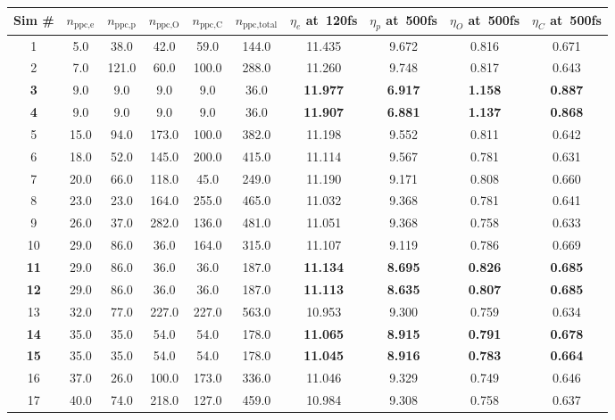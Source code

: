 \renewcommand{\arraystretch}{1}
\setlength{\tabcolsep}{0.25em}
\begin{table}
	\centering
	\begin{tabular}{c|c|c|c|c|c|c|c|c|c}
		\hline
		Sim \# & $n_\text{ppc,e}$ & $n_\text{ppc,p}$ & $n_\text{ppc,O}$ & $n_\text{ppc,C}$ & $n_\text{ppc,total}$ &$\eta_e$ at~120fs & $\eta_p$ at~500fs  & $\eta_O$ at~500fs & $\eta_C$ at~500fs\\
		\hline
		1 & 5.0 & 38.0 & 42.0 & 59.0 & 144.0 & 11.435 & 9.672 & 0.816 & 0.671\\
		2 & 7.0 & 121.0 & 60.0 & 100.0 & 288.0 & 11.260 & 9.748 & 0.817 & 0.643\\
		\textbf{3} & 9.0 & 9.0 & 9.0 & 9.0 & 36.0 & \textbf{11.977} & \textbf{6.917} & \textbf{1.158} & \textbf{0.887}\\
		\textbf{4} & 9.0 & 9.0 & 9.0 & 9.0 & 36.0 & \textbf{11.907} & \textbf{6.881} & \textbf{1.137} & \textbf{0.868}\\
		5 & 15.0 & 94.0 & 173.0 & 100.0 & 382.0 & 11.198 & 9.552 & 0.811 & 0.642\\
		6 & 18.0 & 52.0 & 145.0 & 200.0 & 415.0 & 11.114 & 9.567 & 0.781 & 0.631\\
		7 & 20.0 & 66.0 & 118.0 & 45.0 & 249.0 & 11.190 & 9.171 & 0.808 & 0.660\\
		8 & 23.0 & 23.0 & 164.0 & 255.0 & 465.0 & 11.032 & 9.368 & 0.781 & 0.641\\
		9 & 26.0 & 37.0 & 282.0 & 136.0 & 481.0 & 11.051 & 9.368 & 0.758 & 0.633\\
		10 & 29.0 & 86.0 & 36.0 & 164.0 & 315.0 & 11.107 & 9.119 & 0.786 & 0.669\\
		\textbf{11} & 29.0 & 86.0 & 36.0 & 36.0 & 187.0 & \textbf{11.134} & \textbf{8.695} & \textbf{0.826} & \textbf{0.685}\\
		\textbf{12} & 29.0 & 86.0 & 36.0 & 36.0 & 187.0 & \textbf{11.113} & \textbf{8.635} & \textbf{0.807} & \textbf{0.685}\\
		13 & 32.0 & 77.0 & 227.0 & 227.0 & 563.0 & 10.953 & 9.300 & 0.759 & 0.634\\
		\textbf{14} & 35.0 & 35.0 & 54.0 & 54.0 & 178.0 & \textbf{11.065} & \textbf{8.915} & \textbf{0.791} &  \textbf{0.678}\\
		\textbf{15} & 35.0 & 35.0 & 54.0 & 54.0 & 178.0 & \textbf{11.045} & \textbf{8.916}& \textbf{0.783} & \textbf{0.664}\\
		16 & 37.0 & 26.0 & 100.0 & 173.0 & 336.0 & 11.046 & 9.329 & 0.749 & 0.646\\
		17 & 40.0 & 74.0 & 218.0 & 127.0 & 459.0 & 10.984 & 9.308 & 0.758 & 0.637\\

\end{tabular}
\end{table}
